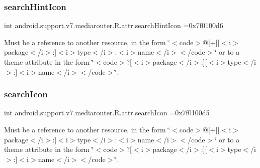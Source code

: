 \subsubsection{\texorpdfstring{search\+Hint\+Icon}{searchHintIcon}}
{\footnotesize\ttfamily int android.\+support.\+v7.\+mediarouter.\+R.\+attr.\+search\+Hint\+Icon =0x7f0100d6\hspace{0.3cm}{\ttfamily [static]}}

Must be a reference to another resource, in the form \char`\"{}$<$code$>$@\mbox{[}+\mbox{]}\mbox{[}$<$i$>$package$<$/i$>$\+:\mbox{]}$<$i$>$type$<$/i$>$\+:$<$i$>$name$<$/i$>$$<$/code$>$\char`\"{} or to a theme attribute in the form \char`\"{}$<$code$>$?\mbox{[}$<$i$>$package$<$/i$>$\+:\mbox{]}\mbox{[}$<$i$>$type$<$/i$>$\+:\mbox{]}$<$i$>$name$<$/i$>$$<$/code$>$\char`\"{}. \mbox{\label{classandroid_1_1support_1_1v7_1_1mediarouter_1_1R_1_1attr_a86c45b75b0c4e4e5fa1de4a74e677040}} 
\subsubsection{\texorpdfstring{search\+Icon}{searchIcon}}
{\footnotesize\ttfamily int android.\+support.\+v7.\+mediarouter.\+R.\+attr.\+search\+Icon =0x7f0100d5\hspace{0.3cm}{\ttfamily [static]}}

Must be a reference to another resource, in the form \char`\"{}$<$code$>$@\mbox{[}+\mbox{]}\mbox{[}$<$i$>$package$<$/i$>$\+:\mbox{]}$<$i$>$type$<$/i$>$\+:$<$i$>$name$<$/i$>$$<$/code$>$\char`\"{} or to a theme attribute in the form \char`\"{}$<$code$>$?\mbox{[}$<$i$>$package$<$/i$>$\+:\mbox{]}\mbox{[}$<$i$>$type$<$/i$>$\+:\mbox{]}$<$i$>$name$<$/i$>$$<$/code$>$\char`\"{}. \mbox{\label{classandroid_1_1support_1_1v7_1_1mediarouter_1_1R_1_1attr_a7f04c9e947e8e75cd0c7e00a8dd23370}} 
